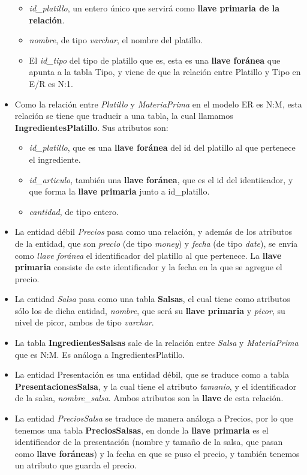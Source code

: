 \documentclass[11pt]{article}
\begin{document}
\begin{itemize}
\begin{itemize}
\item \textit{id\_platillo}, un entero único que servirá como \textbf{llave primaria de la relación}.
\item \textit{nombre}, de tipo \textit{varchar}, el nombre del platillo.
\item El \textit{id\_tipo} del tipo de platillo que es, esta es una \textbf{llave foránea} que apunta a la tabla Tipo, y viene de que la relación entre Platillo y Tipo en E/R es N:1.
\end{itemize}
\item Como la relación entre \textit{Platillo} y \textit{MateriaPrima} en el modelo ER es N:M, esta relación se tiene que traducir a una tabla, la cual llamamos \textbf{IngredientesPlatillo}. Sus atributos son:
\begin{itemize}
\item \textit{id\_platillo}, que es una \textbf{llave foránea} del id del platillo al que pertenece el ingrediente.
\item \textit{id\_articulo}, también una \textbf{llave foránea}, que es el id del identiicador, y que forma la \textbf{llave primaria} junto a id\_platillo.
\item \textit{cantidad}, de tipo entero.
\end{itemize}
\item La entidad débil \textit{Precios} pasa como una relación, y además de los atributos de la entidad, que son \textit{precio} (de tipo \textit{money}) y \textit{fecha} (de tipo \textit{date}), se envía como \textit{llave foránea} el identificador del platillo al que pertenece. La \textbf{llave primaria} consiste de este identificador y la fecha en la que se agregue el precio.
\item La entidad \textit{Salsa} pasa como una tabla \textbf{Salsas}, el cual tiene como atributos sólo los de dicha entidad, \textit{nombre}, que será su \textbf{llave primaria} y \textit{picor}, su nivel de picor, ambos de tipo \textit{varchar}.
\item La tabla \textbf{IngredientesSalsas} sale de la relación entre \textit{Salsa} y \textit{MateriaPrima} que es N:M. Es análoga a IngredientesPlatillo.
\item La entidad Presentación es una entidad débil, que se traduce como a tabla \textbf{PresentacionesSalsa}, y la cual tiene el atributo \textit{tamanio}, y el identificador de la salsa, \textit{nombre\_salsa}. Ambos atributos son la \textbf{llave} de esta relación.
\item La entidad \textit{PreciosSalsa} se traduce de manera análoga a Precios, por lo que tenemos una tabla \textbf{PreciosSalsas}, en donde la \textbf{llave primaria} es el identificador de la presentación (nombre y tamaño de la salsa, que pasan como \textbf{llave foráneas}) y la fecha en que se puso el precio, y también tenemos un atributo que guarda el precio.

\end{itemize}
\end{document}
